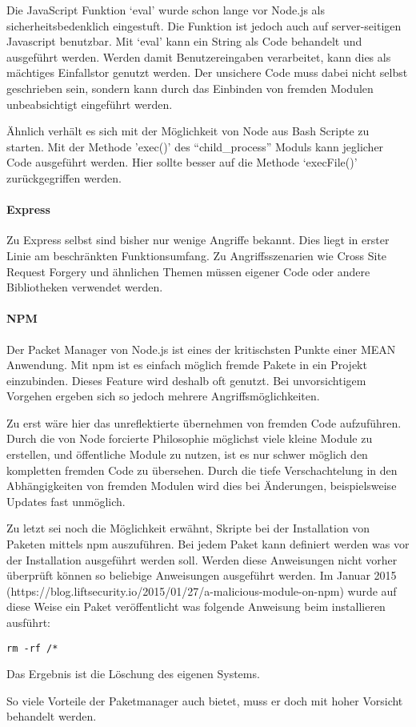 Die JavaScript Funktion `eval' wurde schon lange vor Node.js als
sicherheitsbedenklich eingestuft. Die Funktion ist jedoch auch auf
server-seitigen Javascript benutzbar. Mit `eval' kann ein String als
Code behandelt und ausgeführt werden. Werden damit Benutzereingaben
verarbeitet, kann dies als mächtiges Einfallstor genutzt werden. Der
unsichere Code muss dabei nicht selbst geschrieben sein, sondern kann
durch das Einbinden von fremden Modulen unbeabsichtigt eingeführt
werden.

Ähnlich verhält es sich mit der Möglichkeit von Node aus Bash Scripte zu
starten. Mit der Methode 'exec()' des ``child\_process'' Moduls kann
jeglicher Code ausgeführt werden. Hier sollte besser auf die Methode
`execFile()' zurückgegriffen werden.

\paragraph{Express}\label{express}

Zu Express selbst sind bisher nur wenige Angriffe bekannt. Dies liegt in
erster Linie am beschränkten Funktionsumfang. Zu Angriffsszenarien wie
Cross Site Request Forgery und ähnlichen Themen müssen eigener Code oder
andere Bibliotheken verwendet werden.

\paragraph{NPM}\label{npm}

Der Packet Manager von Node.js ist eines der kritischsten Punkte einer
MEAN Anwendung. Mit npm ist es einfach möglich fremde Pakete in ein
Projekt einzubinden. Dieses Feature wird deshalb oft genutzt. Bei
unvorsichtigem Vorgehen ergeben sich so jedoch mehrere
Angriffsmöglichkeiten.

Zu erst wäre hier das unreflektierte übernehmen von fremden Code
aufzuführen. Durch die von Node forcierte Philosophie möglichst viele
kleine Module zu erstellen, und öffentliche Module zu nutzen, ist es nur
schwer möglich den kompletten fremden Code zu übersehen. Durch die tiefe
Verschachtelung in den Abhängigkeiten von fremden Modulen wird dies bei
Änderungen, beispielsweise Updates fast unmöglich.

Zu letzt sei noch die Möglichkeit erwähnt, Skripte bei der Installation
von Paketen mittels npm auszuführen. Bei jedem Paket kann definiert
werden was vor der Installation ausgeführt werden soll. Werden diese
Anweisungen nicht vorher überprüft können so beliebige Anweisungen
ausgeführt werden. Im Januar 2015
(https://blog.liftsecurity.io/2015/01/27/a-malicious-module-on-npm)
wurde auf diese Weise ein Paket veröffentlicht was folgende Anweisung
beim installieren ausführt:

\begin{verbatim}
rm -rf /*
\end{verbatim}

Das Ergebnis ist die Löschung des eigenen Systems.

So viele Vorteile der Paketmanager auch bietet, muss er doch mit hoher
Vorsicht behandelt werden.

